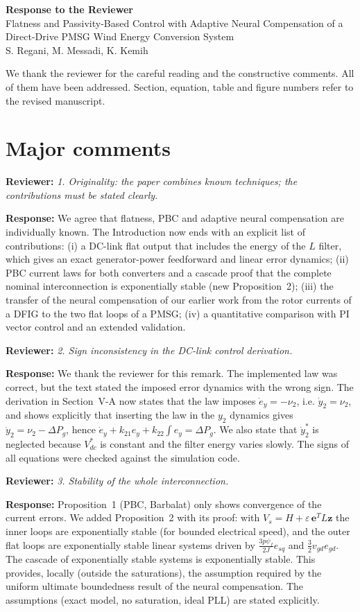 \documentclass[11pt,a4paper]{article}
\newcommand{\rev}[1]{\par\smallskip\noindent\textbf{Reviewer:} \emph{#1}\par\smallskip\noindent\textbf{Response:} }
\begin{document}
\begin{center}
{\Large\bfseries Response to the Reviewer}\\[4pt]
Flatness and Passivity-Based Control with Adaptive Neural Compensation of a Direct-Drive PMSG Wind Energy Conversion System\\[2pt]
S. Regani, M. Messadi, K. Kemih
\end{center}

We thank the reviewer for the careful reading and the constructive comments. All of them have been
addressed. Section, equation, table and figure numbers refer to the revised manuscript.

\section*{Major comments}

\rev{1. Originality: the paper combines known techniques; the contributions must be stated clearly.}
We agree that flatness, PBC and adaptive neural compensation are individually known. The Introduction
now ends with an explicit list of contributions: (i) a DC-link flat output that includes the energy of
the $L$ filter, which gives an exact generator-power feedforward and linear error dynamics;
(ii) PBC current laws for both converters and a cascade proof that the complete nominal interconnection
is exponentially stable (new Proposition~2); (iii) the transfer of the neural compensation of
our earlier work from the rotor currents of a DFIG to the two flat loops of a PMSG;
(iv) a quantitative comparison with PI vector control and an extended validation.

\rev{2. Sign inconsistency in the DC-link control derivation.}
We thank the reviewer for this remark. The implemented law was correct, but the text stated the
imposed error dynamics with the wrong sign. The derivation in Section~V-A now states that the law
imposes $\dot e_y=-\nu_2$, i.e. $\dot y_2=\nu_2$, and shows explicitly that inserting the law in the
$y_2$ dynamics gives $\dot y_2=\nu_2-\Delta P_g$, hence
$\dot e_y+k_{21}e_y+k_{22}\int e_y=\Delta P_g$. We also state that $\dot y_2^*$ is neglected because
$V_{dc}^*$ is constant and the filter energy varies slowly. The signs of all equations were checked
against the simulation code.

\rev{3. Stability of the whole interconnection.}
Proposition~1 (PBC, Barbalat) only shows convergence of the current errors. We added Proposition~2 with
its proof: with $V_s=H+\varepsilon\,\mathbf e^T L\mathbf z$ the inner loops are exponentially stable
(for bounded electrical speed), and the outer flat loops are exponentially stable linear systems driven
by $\frac{3p\psi_f}{2J}e_{sq}$ and $\frac32 v_{gd}e_{gd}$. The cascade of exponentially stable
systems is exponentially stable. This provides, locally (outside the saturations), the assumption
required by the uniform ultimate boundedness result of the neural compensation. The assumptions
(exact model, no saturation, ideal PLL) are stated explicitly.
\end{document}
